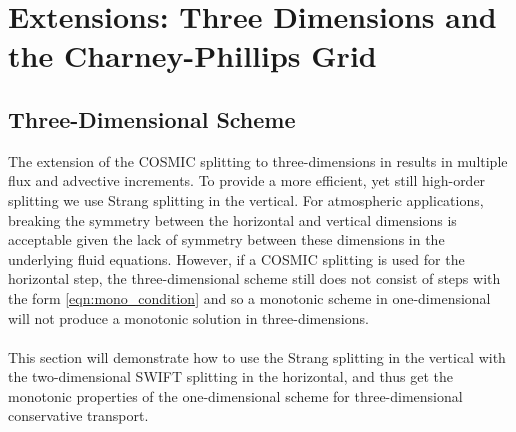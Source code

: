 \documentclass[11pt,a4paper]{article}
\begin{document}
\section{Extensions: Three Dimensions and the Charney-Phillips Grid} \label{sec:3D}
\subsection{Three-Dimensional Scheme}
The extension of the COSMIC splitting to three-dimensions in \cite{leonard1996cosmic} results in multiple flux and advective increments.
To provide a more efficient, yet still high-order splitting we use Strang splitting \citep{strang1968spltting} in the vertical.
For atmospheric applications, breaking the symmetry between the horizontal and vertical dimensions is acceptable given the lack of symmetry between these dimensions in the underlying fluid equations.
However, if a COSMIC splitting is used for the horizontal step, the three-dimensional scheme still does not consist of steps with the form \eqref{eqn:mono_condition} and so a monotonic scheme in one-dimensional will not produce a monotonic solution in three-dimensions.
\\
\\
This section will demonstrate how to use the Strang splitting in the vertical with the two-dimensional SWIFT splitting in the horizontal, and thus get the monotonic properties of the one-dimensional scheme for three-dimensional conservative transport.
\end{document}
